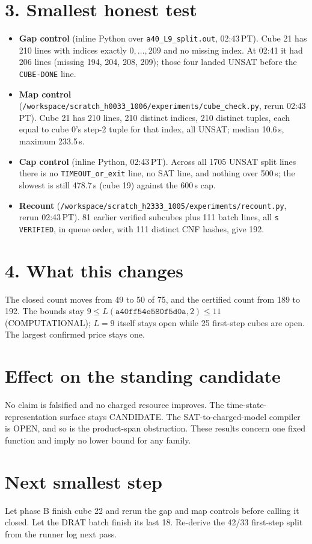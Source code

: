 \documentclass[11pt]{article}
\begin{document}
\section*{3. Smallest honest test}
\begin{itemize}
\item \textbf{Gap control} (inline Python over \texttt{a40\_L9\_split.out}, 02:43\,PT). Cube 21 has 210 lines with indices exactly $0,\dots,209$ and no missing index. At 02:41 it had 206 lines (missing 194, 204, 208, 209); those four landed UNSAT before the \texttt{CUBE-DONE} line.
\item \textbf{Map control} (\texttt{/workspace/scratch\_h0033\_1006/experiments/cube\_check.py}, rerun 02:43\,PT). Cube 21 has 210 lines, 210 distinct indices, 210 distinct tuples, each equal to cube 0's step-2 tuple for that index, all UNSAT; median 10.6\,s, maximum 233.5\,s.
\item \textbf{Cap control} (inline Python, 02:43\,PT). Across all 1705 UNSAT split lines there is no \texttt{TIMEOUT\_or\_exit} line, no SAT line, and nothing over 500\,s; the slowest is still 478.7\,s (cube 19) against the 600\,s cap.
\item \textbf{Recount} (\texttt{/workspace/scratch\_h2333\_1005/experiments/recount.py}, rerun 02:43\,PT). 81 earlier verified subcubes plus 111 batch lines, all \texttt{s VERIFIED}, in queue order, with 111 distinct CNF hashes, give 192.
\end{itemize}

\section*{4. What this changes}
The closed count moves from 49 to 50 of 75, and the certified count from 189 to 192. The bounds stay $9\le L(\texttt{a40ff54e580f5d0a},2)\le 11$ (COMPUTATIONAL); $L=9$ itself stays open while 25 first-step cubes are open. The largest confirmed price stays one.

\section*{Effect on the standing candidate}
No claim is falsified and no charged resource improves. The time-state-representation surface stays CANDIDATE. The SAT-to-charged-model compiler is OPEN, and so is the product-span obstruction. These results concern one fixed function and imply no lower bound for any family.

\section*{Next smallest step}
Let phase B finish cube 22 and rerun the gap and map controls before calling it closed. Let the DRAT batch finish its last 18. Re-derive the 42/33 first-step split from the runner log next pass.
\end{document}
